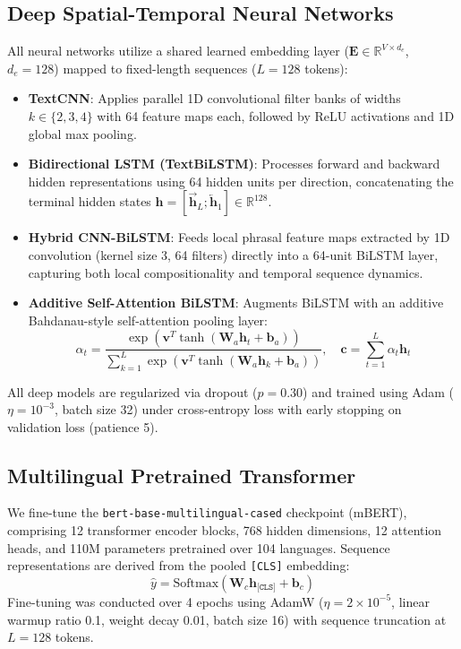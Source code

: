\documentclass[11pt,a4paper]{article}
\begin{document}
\subsection{Deep Spatial-Temporal Neural Networks}
All neural networks utilize a shared learned embedding layer ($\mathbf{E} \in \mathbb{R}^{V \times d_e}$, $d_e = 128$) mapped to fixed-length sequences ($L = 128$ tokens):
\begin{itemize}
    \item \textbf{TextCNN}: Applies parallel 1D convolutional filter banks of widths $k \in \{2, 3, 4\}$ with 64 feature maps each, followed by ReLU activations and 1D global max pooling.
    \item \textbf{Bidirectional LSTM (TextBiLSTM)}: Processes forward and backward hidden representations using 64 hidden units per direction, concatenating the terminal hidden states $\mathbf{h} = [\overrightarrow{\mathbf{h}}_L; \overleftarrow{\mathbf{h}}_1] \in \mathbb{R}^{128}$.
    \item \textbf{Hybrid CNN-BiLSTM}: Feeds local phrasal feature maps extracted by 1D convolution (kernel size 3, 64 filters) directly into a 64-unit BiLSTM layer, capturing both local compositionality and temporal sequence dynamics.
    \item \textbf{Additive Self-Attention BiLSTM}: Augments BiLSTM with an additive Bahdanau-style self-attention pooling layer:
    \begin{equation}
        \alpha_t = \frac{\exp(\mathbf{v}^T \tanh(\mathbf{W}_a \mathbf{h}_t + \mathbf{b}_a))}{\sum_{k=1}^L \exp(\mathbf{v}^T \tanh(\mathbf{W}_a \mathbf{h}_k + \mathbf{b}_a))}, \quad \mathbf{c} = \sum_{t=1}^L \alpha_t \mathbf{h}_t
    \end{equation}
\end{itemize}
All deep models are regularized via dropout ($p = 0.30$) and trained using Adam ($\eta = 10^{-3}$, batch size 32) under cross-entropy loss with early stopping on validation loss (patience 5).

\subsection{Multilingual Pretrained Transformer}
We fine-tune the \texttt{bert-base-multilingual-cased} checkpoint (mBERT), comprising 12 transformer encoder blocks, 768 hidden dimensions, 12 attention heads, and 110M parameters pretrained over 104 languages. Sequence representations are derived from the pooled \texttt{[CLS]} embedding:
\begin{equation}
    \hat{y} = \text{Softmax}(\mathbf{W}_c \mathbf{h}_{\texttt{[CLS]}} + \mathbf{b}_c)
\end{equation}
Fine-tuning was conducted over 4 epochs using AdamW ($\eta = 2 \times 10^{-5}$, linear warmup ratio 0.1, weight decay 0.01, batch size 16) with sequence truncation at $L = 128$ tokens.
\end{document}
